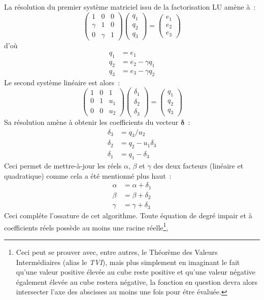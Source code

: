 \documentclass[11pt]{amsart}
\newcommand{\vb}[1]{\mathbf{#1}}
\begin{document}
La r\'esolution du premier syst\`eme matriciel issu de la factorisation LU am\`ene \`a~:
$$\begin{pmatrix} 1 & 0 & 0 \\ \gamma & 1 & 0  \\ 0 & \gamma & 1 \end{pmatrix}\begin{pmatrix} q_1 \\ q_2 \\ q_3 \end{pmatrix}=\begin{pmatrix} e_1 \\ e_2 \\ e_3 \end{pmatrix}$$
d'o\`u
\[
\begin{split}
	q_1 &= e_1 \\
	q_2 &= e_2 - \gamma{}q_1 \\
	q_3 &= e_3 - \gamma{}q_2
\end{split}
\]
Le second syst\`eme lin\'eaire est alors~:
$$\begin{pmatrix} 1 & 0 & 1 \\ 0 & 1 & u_1 \\ 0 & 0 & u_2 \end{pmatrix}\begin{pmatrix} \delta_1 \\ \delta_2 \\ \delta_3 \end{pmatrix}=\begin{pmatrix} q_1 \\ q_2 \\ q_3 \end{pmatrix}$$
Sa r\'esolution am\`ene \`a obtenir les coefficients du vecteur $\vb{\delta}$~:
\[
\begin{split}
\delta_3 &= q_3 / u_2 \\
\delta_2 &= q_2 - u_1\delta_3 \\
\delta_1 &= q_1 - \delta_3
\end{split}
\]
Ceci permet de mettre-\`a-jour les r\'eels $\alpha$, $\beta$ et $\gamma$ des deux facteurs (lin\'eaire et quadratique) comme cela a \'et\'e mentionn\'e plus haut~:
\[
\begin{split}
\alpha &= \alpha + \delta_1 \\
\beta &= \beta + \delta_2 \\
\gamma &= \gamma + \delta_3
\end{split}
\]
Ceci compl\'ete l'ossature de cet algorithme. Toute \'equation de degr\'e impair et \`a coefficients r\'eels poss\`ede au moins une racine r\'eelle\footnote{Ceci peut se prouver avec, entre autres, le Th\'eor\`eme des Valeurs Interm\'ediaires (alias le \textit{TVI}),
mais plus simplement en imaginant le fait qu'une valeur positive \'elev\'ee au cube reste positive et qu'une valeur n\'egative \'egalement \'elev\'ee au cube restera n\'egative, la fonction en question devra alors intersecter l'axe des abscisses au moins une fois pour \'etre \'evalu\'ee.},
\end{document}
